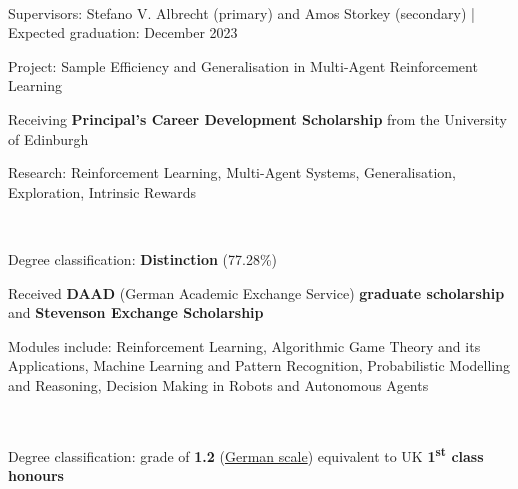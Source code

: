 \documentclass[]{lukas-cv-openfont}
\begin{document}

\noindent
{}
\\
\begin{tightitemize}{1.7em}
    \item Supervisors: Stefano V. Albrecht (primary) and Amos Storkey (secondary) | Expected graduation: December 2023
    \item Project: Sample Efficiency and Generalisation in Multi-Agent Reinforcement Learning
    \item Receiving \textbf{Principal's Career Development Scholarship} from the University of Edinburgh
    \item Research: Reinforcement Learning, Multi-Agent Systems, Generalisation, Exploration, Intrinsic Rewards
\end{tightitemize}
\largesectionsep

\noindent
{}
\\
\begin{tightitemize}{1.7em}
    \item Degree classification: \textbf{Distinction} (77.28\%)
    \item Received \textbf{DAAD} (German Academic Exchange Service) \textbf{graduate scholarship} and \textbf{Stevenson Exchange Scholarship} 
    \item Modules include: Reinforcement Learning, Algorithmic Game Theory and its Applications, Machine Learning and 
    Pattern Recognition, Probabilistic Modelling and Reasoning, Decision Making in Robots and Autonomous Agents
\end{tightitemize}
\largesectionsep

\noindent
{}
\\
\begin{tightitemize}{1.7em}
    \item Degree classification: grade of \textbf{1.2} (\href{https://en.wikipedia.org/wiki/Academic_grading_in_Germany}{German scale}) equivalent to UK \textbf{1\textsuperscript{st} class honours}
\end{tightitemize}
\largesectionsep
\end{document}
